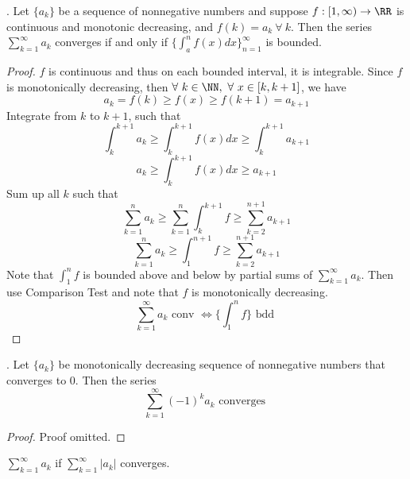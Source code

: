 \documentclass[12pt]{scrartcl}
\begin{document}
\begin{theorem}
  . Let $\{a_k\}$ be a sequence of nonnegative numbers and suppose $f: [1, \infty) \to \RR$ is continuous and monotonic decreasing, and $f(k) = a_k \ \forall \ k$.
  Then the series $\sum_{k=1}^\infty a_k$ converges if and only if $\{\int_a^n f(x) dx\}_{n=1}^\infty$ is bounded.
  \begin{proof}
    $f$ is continuous and thus on each bounded interval, it is integrable. Since $f$ is monotonically decreasing, 
    then $\forall \ k \in \NN, \ \forall \ x \in [k, k + 1]$, we have 
    \[a_k = f(k) \geq f(x) \geq f(k + 1) = a_{k+1}\]
    Integrate from $k$ to $k+1$, such that 
    \[\int_k^{k + 1} a_k \geq \int_k^{k+1} f(x) dx \geq \int_k^{k+1}a_{k+1}\]
    \[a_k \geq \int_k^{k+1} f(x) dx \geq a_{k+1}\]
    Sum up all $k$ such that 
    \[\sum_{k=1}^n a_k \geq \sum_{k=1}^n \int_k^{k+1} f \geq \sum_{k=2}^{n+1}a_{k+1}\]
    \[\sum_{k=1}^n a_k \geq \int_1^{n+1} f \geq \sum_{k=2}^{n+1}a_{k+1}\]
    Note that $\int_1^n f$ is bounded above and below by partial sums of $\sum_{k=1}^\infty a_k$. Then use Comparison Test 
    and note that $f$ is monotonically decreasing. 
    \[\sum_{k=1}^\infty a_k \text{ conv } \Longleftrightarrow \{\int_1^n f\} \text{ bdd }\]
  \end{proof}
\end{theorem}

\begin{theorem}
  . Let $\{a_k\}$ be monotonically decreasing sequence 
  of nonnegative numbers that converges to $0$. Then the series 
  \[\sum_{k=1}^\infty (-1)^k a_k \text{ converges }\]
  \begin{proof}
    Proof omitted.
  \end{proof}
\end{theorem}

\begin{definition}
  $\sum_{k=1}^\infty a_k$  if $\sum_{k=1}^\infty |a_k|$ converges.
\end{definition}
\end{document}
